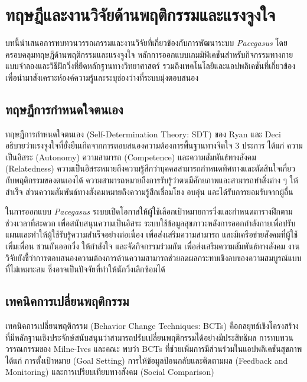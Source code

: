 \section{ทฤษฎีและงานวิจัยด้านพฤติกรรมและแรงจูงใจ}

บทนี้นำเสนอการทบทวนวรรณกรรมและงานวิจัยที่เกี่ยวข้องกับการพัฒนาระบบ \textit{Pacegasus} โดยครอบคลุมทฤษฎีด้านพฤติกรรมและแรงจูงใจ หลักการออกแบบเกมมิฟิเคชันสำหรับกิจกรรมทางกาย แบบจำลองและวิธีฝึกวิ่งที่ยึดหลักฐานทางวิทยาศาสตร์ รวมถึงเทคโนโลยีและแอปพลิเคชันที่เกี่ยวข้อง เพื่อนำมาสังเคราะห์องค์ความรู้และระบุช่องว่างที่ระบบมุ่งตอบสนอง

\subsection{ทฤษฎีการกำหนดใจตนเอง}

ทฤษฎีการกำหนดใจตนเอง (Self-Determination Theory: SDT) ของ Ryan และ Deci \cite{ryan2020} อธิบายว่าแรงจูงใจที่ยั่งยืนเกิดจากการตอบสนองความต้องการพื้นฐานทางจิตใจ 3 ประการ ได้แก่ ความเป็นอิสระ (Autonomy) ความสามารถ (Competence) และความสัมพันธ์ทางสังคม (Relatedness) ความเป็นอิสระหมายถึงความรู้สึกว่าบุคคลสามารถกำหนดทิศทางและตัดสินใจเกี่ยวกับพฤติกรรมของตนเองได้ ความสามารถหมายถึงการรับรู้ว่าตนมีศักยภาพและสามารถทำสิ่งต่าง ๆ ให้สำเร็จ ส่วนความสัมพันธ์ทางสังคมหมายถึงความรู้สึกเชื่อมโยง อบอุ่น และได้รับการยอมรับจากผู้อื่น

ในการออกแบบ \textit{Pacegasus} ระบบเปิดโอกาสให้ผู้ใช้เลือกเป้าหมายการวิ่งและกำหนดตารางฝึกตามช่วงเวลาที่สะดวก เพื่อสนับสนุนความเป็นอิสระ ระบบใช้ข้อมูลสุขภาวะหลังการออกกำลังกายเพื่อปรับแผนและทำให้ผู้ใช้รับรู้ความสำเร็จอย่างต่อเนื่อง เพื่อส่งเสริมความสามารถ และมีเครือข่ายสังคมที่ผู้ใช้เพิ่มเพื่อน ชวนกันออกวิ่ง ให้กำลังใจ และจัดกิจกรรมร่วมกัน เพื่อส่งเสริมความสัมพันธ์ทางสังคม งานวิจัยยังชี้ว่าการตอบสนองความต้องการด้านความสามารถช่วยลดผลกระทบเชิงลบของความสมบูรณ์แบบที่ไม่เหมาะสม ซึ่งอาจเป็นปัจจัยที่ทำให้นักวิ่งเลิกซ้อมได้ \cite{harnois2022}

\subsection{เทคนิคการเปลี่ยนพฤติกรรม}

เทคนิคการเปลี่ยนพฤติกรรม (Behavior Change Techniques: BCTs) คือกลยุทธ์เชิงโครงสร้างที่มีหลักฐานเชิงประจักษ์สนับสนุนว่าสามารถปรับเปลี่ยนพฤติกรรมได้อย่างมีประสิทธิผล การทบทวนวรรณกรรมของ Milne-Ives และคณะ \cite{milneives2023} พบว่า BCTs ที่ช่วยเพิ่มการมีส่วนร่วมในแอปพลิเคชันสุขภาพ ได้แก่ การตั้งเป้าหมาย (Goal Setting) การให้ข้อมูลป้อนกลับและติดตามผล (Feedback and Monitoring) และการเปรียบเทียบทางสังคม (Social Comparison)

